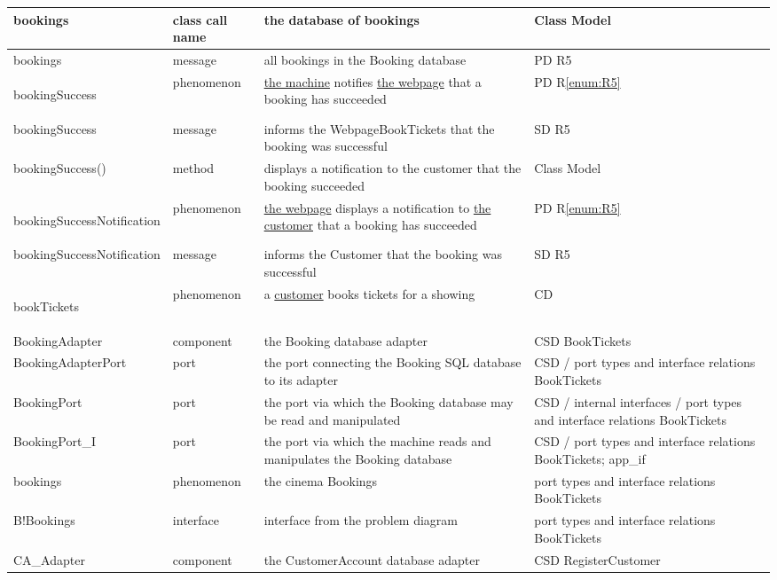 \documentclass[a4paper,10pt,titlepage,bibtotoc,bibtotocnumbered]{scrreprt}
\begin{document}
\begin{longtable}{|p{.4\linewidth}|p{.2\linewidth}|p{.2\linewidth}|p{.2\linewidth}|}
\hline
bookings & class call name & the database of bookings & Class Model\\
\hline
bookings & message & all bookings in the Booking database & PD R5\\
\hline
\hypertarget{glossary:bookingSuccess}{bookingSuccess} & phenomenon & \hyperlink{glossary:UDEKino}{the machine} notifies \hyperlink{glossary:WebpageBookTickets}{the webpage} that a booking has succeeded & PD R\ref{enum:R5}\\
\hline
bookingSuccess & message & informs the WebpageBookTickets that the booking was successful & SD R5\\
\hline
bookingSuccess() & method & displays a notification to the customer that the booking succeeded & Class Model\\
\hline
\hypertarget{glossary:bookingSuccessNotification}{bookingSuccessNotification} & phenomenon & \hyperlink{glossary:WebpageBookTickets}{the webpage} displays a notification to \hyperlink{glossary:Customer}{the customer} that a booking has succeeded & PD R\ref{enum:R5}\\
\hline
bookingSuccessNotification & message & informs the Customer that the booking was successful & SD R5\\
\hline
\hypertarget{glossary:bookTickets}{bookTickets} & phenomenon & a \hyperlink{glossary:Customer}{customer} books tickets for a showing & CD\\
\hline
BookingAdapter & component & the Booking database adapter & CSD BookTickets\\
\hline
BookingAdapterPort & port & the port connecting the Booking SQL database to its adapter & CSD / port types and interface relations BookTickets\\
\hline
BookingPort & port & the port via which the Booking database may be read and manipulated & CSD / internal interfaces / port types and interface relations BookTickets\\
\hline
BookingPort\_I & port & the port via which the machine reads and manipulates the Booking database & CSD / port types and interface relations BookTickets; app\_if\\
\hline
bookings & phenomenon & the cinema Bookings & port types and interface relations BookTickets\\
\hline
B!{Bookings} & interface & interface from the problem diagram & port types and interface relations BookTickets\\
\hline
CA\_Adapter & component & the CustomerAccount database adapter & CSD RegisterCustomer\\

\end{longtable}
\end{document}
